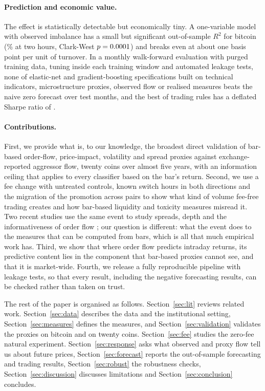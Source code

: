 \documentclass[11pt]{article}
\begin{document}
\paragraph{Prediction and economic value.} The effect is statistically detectable but economically
tiny. A one-variable model with observed imbalance has a small but significant out-of-sample $R^2$
for bitcoin (\BTCspRtwo\% at two hours, Clark-West $p=0.0001$) and breaks even at about one basis
point per unit of turnover. In a monthly walk-forward evaluation with purged training data, tuning
inside each training window and automated leakage tests, none of \BTCnModels{} elastic-net and
gradient-boosting specifications built on technical indicators, microstructure proxies, observed flow
or realised measures beats the naive zero forecast over \BTCnFoldsWF{} test months, and the best of
\BTCnTrials{} trading rules has a deflated Sharpe ratio \citep{bailey2014} of \BTCbestDSR.

\paragraph{Contributions.} First, we provide what is, to our knowledge, the broadest direct
validation of bar-based order-flow, price-impact, volatility and spread proxies against
exchange-reported aggressor flow, twenty coins over almost five years, with an information ceiling
that applies to every classifier based on the bar's return. Second, we use a fee change with
untreated controls, known switch hours in both directions and the migration of the promotion across
pairs to show what kind of volume fee-free trading creates and how bar-based liquidity and toxicity
measures misread it. Two recent studies use the same event to study spreads, depth and the
informativeness of order flow \citep{galati2024,bozzetto2026}; our question is different: what the
event does to the measures that can be computed from bars, which is all that much empirical work
has. Third, we show that where
order flow predicts intraday returns, its predictive content lies in the component that bar-based
proxies cannot see, and that it is market-wide. Fourth, we release a fully reproducible pipeline with
leakage tests, so that every result, including the negative forecasting results, can be checked
rather than taken on trust.

The rest of the paper is organised as follows. Section~\ref{sec:lit} reviews related work.
Section~\ref{sec:data} describes the data and the institutional setting, Section~\ref{sec:measures}
defines the measures, and Section~\ref{sec:validation} validates the proxies on bitcoin and on twenty
coins. Section~\ref{sec:fee} studies the zero-fee natural experiment. Section~\ref{sec:response}
asks what observed and proxy flow tell us about future prices, Section~\ref{sec:forecast} reports
the out-of-sample forecasting and trading results, Section~\ref{sec:robust} the robustness checks,
Section~\ref{sec:discussion} discusses limitations and Section~\ref{sec:conclusion} concludes.
\end{document}
